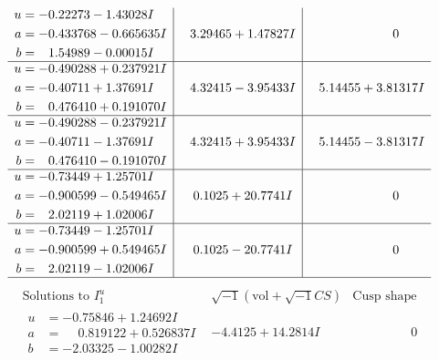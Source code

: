 \documentclass[1p]{elsarticle_modified}
\theoremstyle{definition}
\newcommand{\I}{\sqrt{-1}}
\begin{document}
$$\begin{array}{c|c|c}
\begin{aligned}
u &= -0.22273 - 1.43028 I \\
a &= -0.433768 - 0.665635 I \\
b &= \phantom{-}1.54989 - 0.00015 I\end{aligned}
 & \phantom{-}3.29465 + 1.47827 I & \phantom{-0.000000 } 0 \\ \hline\begin{aligned}
u &= -0.490288 + 0.237921 I \\
a &= -0.40711 + 1.37691 I \\
b &= \phantom{-}0.476410 + 0.191070 I\end{aligned}
 & \phantom{-}4.32415 - 3.95433 I & \phantom{-}5.14455 + 3.81317 I \\ \hline\begin{aligned}
u &= -0.490288 - 0.237921 I \\
a &= -0.40711 - 1.37691 I \\
b &= \phantom{-}0.476410 - 0.191070 I\end{aligned}
 & \phantom{-}4.32415 + 3.95433 I & \phantom{-}5.14455 - 3.81317 I \\ \hline\begin{aligned}
u &= -0.73449 + 1.25701 I \\
a &= -0.900599 - 0.549465 I \\
b &= \phantom{-}2.02119 + 1.02006 I\end{aligned}
 & \phantom{-}0.1025 + 20.7741 I & \phantom{-0.000000 } 0 \\ \hline\begin{aligned}
u &= -0.73449 - 1.25701 I \\
a &= -0.900599 + 0.549465 I \\
b &= \phantom{-}2.02119 - 1.02006 I\end{aligned}
 & \phantom{-}0.1025 - 20.7741 I & \phantom{-0.000000 } 0\\
 \hline 
 \end{array}$$\newpage$$\begin{array}{c|c|c}  
\text{Solutions to }I^u_{1}& \I (\text{vol} + \sqrt{-1}CS) & \text{Cusp shape}\\
 \hline 
\begin{aligned}
u &= -0.75846 + 1.24692 I \\
a &= \phantom{-}0.819122 + 0.526837 I \\
b &= -2.03325 - 1.00282 I\end{aligned}
 & -4.4125 + 14.2814 I & \phantom{-0.000000 } 0 \\ \hline\begin{aligned}

\end{aligned}
\end{array}$$
\end{document}

